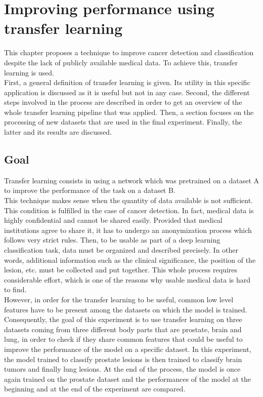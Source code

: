 
\chapter{Improving performance using transfer learning}
\label{ch:transfer_learning}
This chapter proposes a technique to improve cancer detection and classification despite the lack of publicly available medical data. To achieve this, transfer learning is used.\\
First, a general definition of transfer learning is given. Its utility in this specific application is discussed as it is useful but not in any case. Second, the different steps involved in the process are described in order to get an overview of the whole transfer learning pipeline that was applied. Then, a section focuses on the processing of new datasets that are used in the final experiment. Finally, the latter and its results are discussed. 


\section{Goal}
Transfer learning consists in using a network which was pretrained on a dataset A to improve the performance of the task on a dataset B.\\
This technique makes sense when the quantity of data available is not sufficient. This condition is fulfilled in the case of cancer detection. In fact, medical data is highly confidential and cannot be shared easily. Provided that medical institutions agree to share it, it has to undergo an anonymization process which follows very strict rules. Then, to be usable as part of a deep learning classification task, data must be organized and described precisely. In other words, additional information such as the clinical significance, the position of the lesion, etc. must be collected and put together. This whole process requires considerable effort, which is one of the reasons why usable medical data is hard to find.\\
However, in order for the transfer learning to be useful, common low level features have to be present among the datasets on which the model is trained. Consequently, the goal of this experiment is to use transfer learning on three datasets coming from three different body parts that are prostate, brain and lung, in order to check if they share common features that could be useful to improve the performance of the model on a specific dataset. In this experiment, the model trained to classify prostate lesions is then trained to classify brain tumors and finally lung lesions. At the end of the process, the model is once again trained on the prostate dataset and the performances of the model at the beginning and at the end of the experiment are compared.


